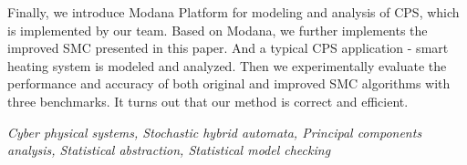 Finally, we introduce Modana Platform for modeling and analysis of CPS, which is implemented by our team. Based on Modana, we further implements the improved SMC presented in this paper. And a typical CPS application - smart heating system is modeled and analyzed. Then we experimentally evaluate the performance and accuracy of both original and improved SMC algorithms with three benchmarks. It turns out that our method is correct and efficient.

{} \textit{Cyber physical systems, Stochastic hybrid automata, Principal components analysis, Statistical abstraction, Statistical model checking}


































